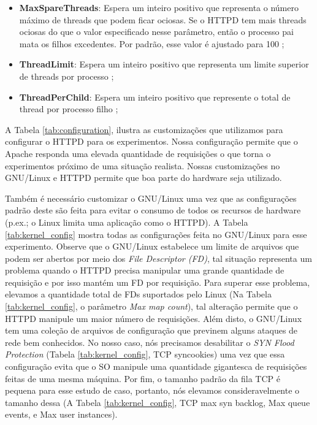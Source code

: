 \begin{itemize}
  \item \textbf{MaxSpareThreads}:
Espera um inteiro positivo que representa o número máximo de threads que podem
ficar ociosas. Se o HTTPD tem mais threads ociosas do que o valor especificado
nesse parâmetro, então o processo pai mata os filhos excedentes. Por padrão,
esse valor é ajustado para 100 \citep{mpm_maxsparethreads};

  \item \textbf{ThreadLimit}:
Espera um inteiro positivo que representa um limite superior de threads por
processo \citep{mpm_threadlimits};

  \item \textbf{ThreadPerChild}:
Espera um inteiro positivo que represente o total de thread por processo filho
\citep{mpm_threadperchild};

\end{itemize}



A Tabela \ref{tab:configuration}, ilustra as customizações que utilizamos para
configurar o HTTPD para os experimentos. Nossa configuração permite que o
Apache responda uma elevada quantidade de requisições o que torna o
experimentos próximo de uma situação realista. Nossas customizações no
GNU/Linux e HTTPD permite que boa parte do hardware seja utilizado.



Também é necessário customizar o GNU/Linux uma vez que as configurações padrão
deste são feita para evitar o consumo de todos os recursos de hardware (p.ex.; o
Linux limita uma aplicação como o HTTPD). A Tabela \ref{tab:kernel_config}
mostra todas as configurações feita no GNU/Linux para esse experimento.
Observe que o GNU/Linux estabelece um limite de arquivos que podem ser abertos
por meio dos \emph{File Descriptor (FD)}, tal situação representa um problema
quando o HTTPD precisa manipular uma grande quantidade de requisição e por isso
mantém um FD por requisição. Para superar esse problema, elevamos a quantidade
total de FDs suportados pelo Linux (Na Tabela \ref{tab:kernel_config}, o
parâmetro \emph{Max map count}), tal alteração permite que o HTTPD manipule um
maior número de requisições. Além disto, o GNU/Linux tem uma coleção de
arquivos de configuração que previnem alguns ataques de rede bem conhecidos. No
nosso caso, nós precisamos desabilitar o \emph{SYN Flood Protection} (Tabela
\ref{tab:kernel_config}, TCP syncookies) uma vez que essa configuração evita
que o SO manipule uma quantidade gigantesca de requisições feitas de uma mesma
máquina. Por fim, o tamanho padrão da fila TCP é pequena para esse estudo de
caso, portanto, nós elevamos consideravelmente o tamanho dessa (A Tabela
\ref{tab:kernel_config}, TCP max syn backlog, Max queue events, e Max user
instances).

